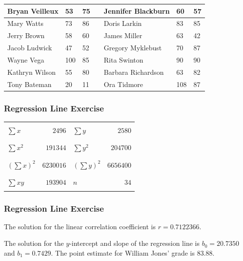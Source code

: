 \documentclass[xcolor=dvipsnames]{beamer}
\begin{document}
\begin{frame}
\begin{footnotesize}
\begin{tabular}{|l|l|l|l|l|l|l|}
\hline
Bryan Veilleux & 53 & 75 & & Jennifer Blackburn & 60 & 57 \\
\hline
Mary Watts & 73 & 86 & & Doris Larkin & 83 & 85 \\
\hline
Jerry Brown & 58 & 60 & & James Miller & 63 & 42 \\
\hline
Jacob Ludwick & 47 & 52 & & Gregory Myklebust & 70 & 87 \\
\hline
Wayne Vega & 100 & 85 & & Rita Swinton & 90 & 90 \\
\hline
Kathryn Wilson & 55 & 80 & & Barbara Richardson & 63 & 82 \\
\hline
Tony Bateman & 20 & 11 & & Ora Tidmore & 108 & 87 \\
\hline
\end{tabular}
  \end{footnotesize}
\end{frame}

\begin{frame}
  \frametitle{Regression Line Exercise}
  \begin{tabular}{|l|r|l|r|}\hline
    \hspace{.5in} & & & \\
    $\sum{}x$ & $2496$ & $\sum{}y$ & $2580$ \\
    \hspace{.5in} & & & \\ \hline
    \hspace{.5in} & & & \\
    $\sum{}x^{2}$ & $191344$ & $\sum{}y^{2}$ & $204700$ \\
    \hspace{.5in} & & & \\ \hline
    \hspace{.5in} & & & \\
    $\left(\sum{}x\right)^{2}$ & $6230016$ & $\left(\sum{}y\right)^{2}$ & $6656400$ \\
    \hspace{.5in} & & & \\ \hline
    \hspace{.5in} & & & \\
    $\sum{}xy$ & $193904$ & $n$ & $34$ \\
    \hspace{.5in} & & & \\ \hline
  \end{tabular}
\end{frame}

\begin{frame}
  \frametitle{Regression Line Exercise}
  The solution for the linear correlation coefficient is
  $r=0.7122366$.

  \bigskip

  The solution for the $y$-intercept and slope of the regression
  line is $b_{0}=20.7350$ and $b_{1}=0.7429$. The point estimate
  for William Jones' grade is $83.88$.
\end{frame}
\end{document}
